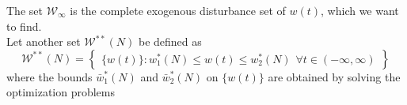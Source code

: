 \documentclass[letterpaper, 10 pt, conference]{ieeeconf}  %
\newcommand{\notimplies}{%
	\mathrel{{\ooalign{\hidewidth$\not\phantom{=}$\hidewidth\cr$\implies$}}}}
\newcommand{\SK}[1]{\textbf{\color{blue}{[SK: #1]}}}
\begin{document}
The set $\mathcal{W}_{\infty}$ is the complete exogenous disturbance set of $w(t)$, which we want to find.
	\\
Let another set $\mathcal{W}^{**}(N)$ be defined as
\begin{equation}
		\hspace{0pt}
		\mathcal{W}^{**}(N) = \begin{Bmatrix} \{w(t)\}: 
		w_1^*(N)\leq w(t)\leq w_2^*(N) \hspace{5pt}
		\forall t \in (-\infty,\infty) 
		\end{Bmatrix}
    \label{eq:W**N}
\end{equation}  
where the bounds $\bar w_1^*(N)$ and $\bar w_2^*(N)$ on $\{w(t)\}$ are obtained by solving the optimization problems %
\end{document}
